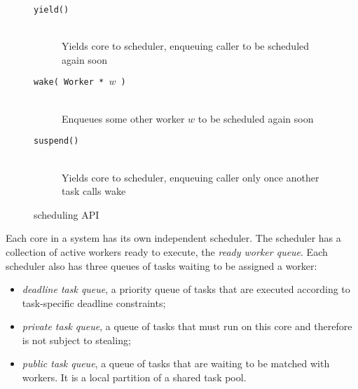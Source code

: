 \begin{figure}[htbp]
  \begin{center}
  \begin{minipage}{0.95\columnwidth}  
  \begin{description}
    \item[\texttt{yield() }] \hfill \\
      Yields core to scheduler, enqueuing caller to be scheduled again soon
    \item[\texttt{wake( Worker * $w$ ) }] \hfill \\
      Enqueues some other worker $w$ to be scheduled again soon
    \item[\texttt{suspend() } ] \hfill \\
      Yields core to scheduler, enqueuing caller only once another task calls wake
	\end{description}
  \end{minipage}
    \begin{minipage}{0.95\columnwidth}
      \caption{\label{fig:scheduling} \Grappa scheduling API
      }
    \end{minipage}
  \end{center}
\end{figure}

Each core in a \Grappa system has its own independent scheduler. The scheduler
has a collection of active workers ready to execute, the {\it
ready worker queue}. Each scheduler also has three queues of tasks
waiting to be assigned a worker:

\begin{itemize}

\item {\it deadline task queue}, a priority queue of tasks that are executed according to task-specific deadline constraints;

\item {\it private task queue}, a queue of tasks that must run on
this core and therefore is not subject to stealing;

\item {\it public task queue}, a queue of tasks that are
  waiting to be matched with workers. It is a local partition of a shared
  task pool.

\end{itemize}



